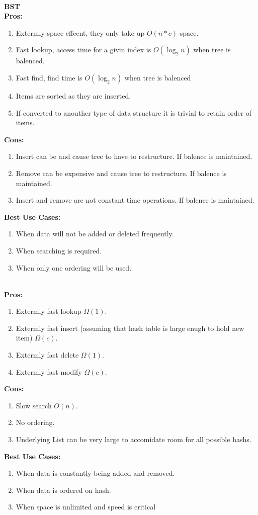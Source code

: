 \documentclass[11pt]{article}
\begin{document}
	\\
	{\bf BST }\\
	{\bf Pros:}
	\begin{enumerate}
		\item Extermly space effcent, they only take up $O(n*c)$ space.
		\item Fast lookup, access time for a givin index is $O(\log_{2} n)$ when tree is balenced.
		\item Fast find, find time is $O(\log_{2} n)$ when tree is balenced
		\item Items are sorted as they are inserted. 
		\item If converted to anouther type of data structure it is trivial to retain order of items.
	\end{enumerate}
	{\bf Cons:}
	\begin{enumerate}
		\item Insert can be and cause tree to have to restructure. If balence is maintained.
		\item Remove can be expensive and cause tree to restructure. If balence is maintained.
		\item Insert and remove are not constant time operations. If balence is maintained.
	\end{enumerate}
	{\bf Best Use Cases:}
	\begin{enumerate}
		\item When data will not be added or deleted frequently.
		\item When searching is required.
		\item When only one ordering will be used.
	\end{enumerate}
	\newpage
	\\
	{\bf Pros:}
	\begin{enumerate}
		\item Extermly fast lookup $\Omega(1)$.
		\item Extermly fast insert (assuming that hash table is large enugh to hold new item) $\Omega(c)$.
		\item Extermly fast delete $\Omega(1)$.
		\item Extermly fast modify $\Omega(c)$.
	\end{enumerate}
	{\bf Cons:}
	\begin{enumerate}
		\item Slow search $O(n)$.
		\item No ordering.
		\item Underlying List can be very large to accomidate room for all possible hashs.
	\end{enumerate}
	{\bf Best Use Cases:}
	\begin{enumerate}
		\item When data is constantly being added and removed.
		\item When data is ordered on hash.
		\item When space is unlimited and speed is critical
	\end{enumerate}
	
\end{document}
